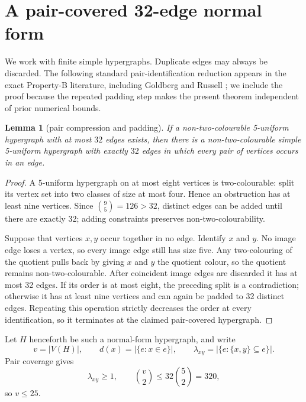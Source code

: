 \documentclass[11pt]{article}
\newtheorem{lemma}[theorem]{Lemma}
\theoremstyle{remark}
\begin{document}
\section{A pair-covered 32-edge normal form}\label{sec:normal}

We work with finite simple hypergraphs.  Duplicate edges may always be
discarded.  The following standard pair-identification reduction appears in
the exact Property-B literature, including Goldberg and Russell
\cite{GoldbergRussell1995}; we include the proof because the repeated padding
step makes the present theorem independent of prior numerical bounds.

\begin{lemma}[pair compression and padding]\label{lem:compression}
If a non-two-colourable 5-uniform hypergraph with at most $32$ edges exists,
then there is a non-two-colourable simple 5-uniform hypergraph with exactly
$32$ edges in which every pair of vertices occurs in an edge.
\end{lemma}

\begin{proof}
A 5-uniform hypergraph on at most eight vertices is two-colourable: split
its vertex set into two classes of size at most four.  Hence an obstruction
has at least nine vertices.  Since $\binom95=126>32$, distinct edges can be
added until there are exactly 32; adding constraints preserves
non-two-colourability.

Suppose that vertices $x,y$ occur together in no edge.  Identify $x$ and
$y$.  No image edge loses a vertex, so every image edge still has size five.
Any two-colouring of the quotient pulls back by giving $x$ and $y$ the
quotient colour, so the quotient remains non-two-colourable.  After
coincident image edges are discarded it has at most 32 edges.  If its order
is at most eight, the preceding split is a contradiction; otherwise it has
at least nine vertices and can again be padded to 32 distinct edges.
Repeating this operation strictly decreases the order at every
identification, so it terminates at the claimed pair-covered hypergraph.
\end{proof}

Let $H$ henceforth be such a normal-form hypergraph, and write
\[
v=|V(H)|,\qquad d(x)=|\{e:x\in e\}|,
\qquad \lambda_{xy}=|\{e:\{x,y\}\subseteq e\}|.
\]
Pair coverage gives
\begin{equation}\label{eq:pair-cover}
\lambda_{xy}\ge1,
\qquad
\binom v2\le32\binom52=320,
\end{equation}
so $v\le25$.
\end{document}
